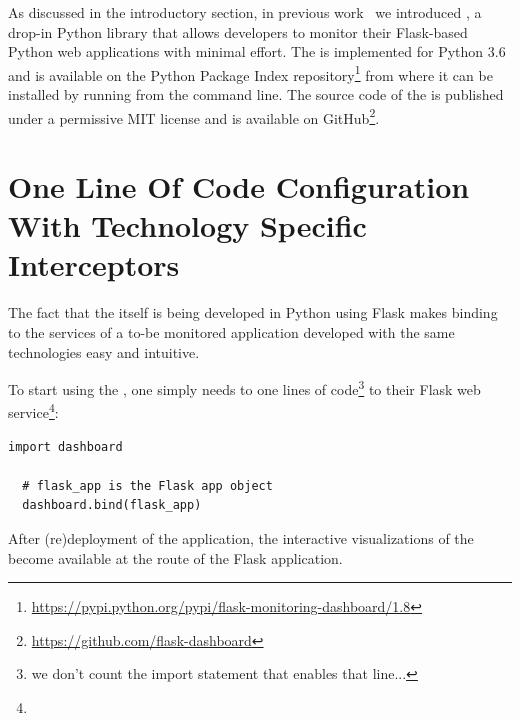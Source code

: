 \documentclass[conference]{IEEEtran}
\begin{document}
  As discussed in the introductory section, in previous work~\cite{vogel2017low} we introduced \tool, a drop-in Python library that allows developers to monitor their Flask-based Python web applications with minimal effort.
%
  The \tool is implemented for Python 3.6 and is available on the Python Package Index repository\footnote{\url{https://pypi.python.org/pypi/flask-monitoring-dashboard/1.8}} from where it can be installed by running \install from the command line. 
%  
  The source code of the \tool is published under a permissive MIT license and is available on GitHub\footnote{\url{https://github.com/flask-dashboard}}.
  
  

  \newpage
  \section{One Line Of Code Configuration With Technology Specific Interceptors}
  
  The fact that the \tool itself is being developed in Python using Flask makes binding to the services of a to-be monitored application developed with the same technologies easy and intuitive. 


  To start using the \tool, one simply needs to one lines of code\footnote{we don't count the import statement that enables that line...} to their Flask web service\footnote{}:

  \begin{lstlisting}[style=custompython]
  import dashboard

  # flask_app is the Flask app object
  dashboard.bind(flask_app)
  \end{lstlisting}

   After (re)deployment of the application, the interactive visualizations of the \tool become available at the  route of the Flask application. 
\end{document}
